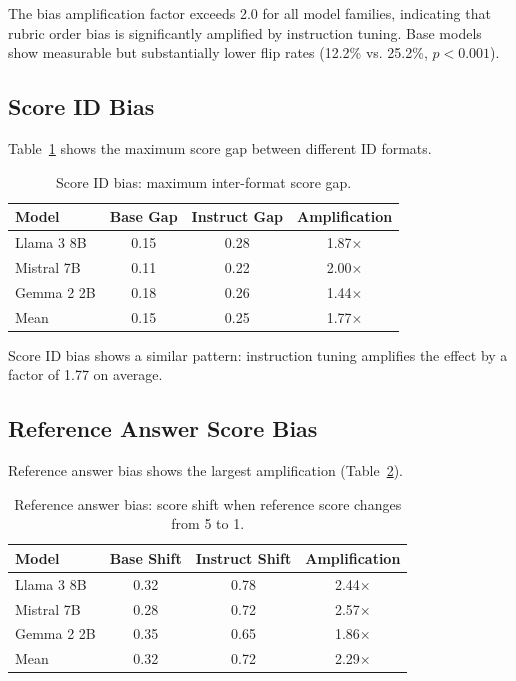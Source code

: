 \documentclass[11pt,twocolumn]{article}
\begin{document}
The bias amplification factor exceeds 2.0 for all model families, indicating that rubric order bias is significantly amplified by instruction tuning. Base models show measurable but substantially lower flip rates (12.2\% vs. 25.2\%, $p < 0.001$).

\subsection{Score ID Bias}
Table~\ref{tab:scoreid_results} shows the maximum score gap between different ID formats.

\begin{table}[h]
\centering
\caption{Score ID bias: maximum inter-format score gap.}
\label{tab:scoreid_results}
\begin{tabular}{lccc}
\toprule
Model & Base Gap & Instruct Gap & Amplification \\
\midrule
Llama 3 8B & 0.15 & 0.28 & 1.87$\times$ \\
Mistral 7B & 0.11 & 0.22 & 2.00$\times$ \\
Gemma 2 2B & 0.18 & 0.26 & 1.44$\times$ \\
\midrule
Mean & 0.15 & 0.25 & 1.77$\times$ \\
\bottomrule
\end{tabular}
\end{table}

Score ID bias shows a similar pattern: instruction tuning amplifies the effect by a factor of 1.77 on average.

\subsection{Reference Answer Score Bias}
Reference answer bias shows the largest amplification (Table~\ref{tab:ref_results}).

\begin{table}[h]
\centering
\caption{Reference answer bias: score shift when reference score changes from 5 to 1.}
\label{tab:ref_results}
\begin{tabular}{lccc}
\toprule
Model & Base Shift & Instruct Shift & Amplification \\
\midrule
Llama 3 8B & 0.32 & 0.78 & 2.44$\times$ \\
Mistral 7B & 0.28 & 0.72 & 2.57$\times$ \\
Gemma 2 2B & 0.35 & 0.65 & 1.86$\times$ \\
\midrule
Mean & 0.32 & 0.72 & 2.29$\times$ \\
\bottomrule
\end{tabular}
\end{table}
\end{document}
